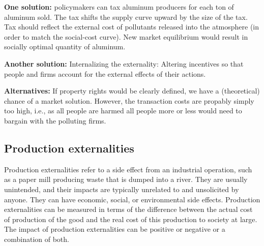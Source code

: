 \textbf{One solution:} policymakers can tax aluminum producers for each ton of aluminum sold.
The tax shifts the supply curve upward by the size of the tax.
Tax should reflect the external cost of pollutants released into the atmosphere (in order to match the social-cost curve).
New market equilibrium would result in socially optimal quantity of aluminum.

\textbf{Another solution:} Internalizing the externality: Altering incentives so that people and firms account for the external effects of their actions.

\textbf{Alternatives:} If property rights would be clearly defined, we have a (theoretical) chance of a market solution. However, the transaction costs are propably simply too high, i.e., as all people are harmed all people more or less would need to bargain with the polluting firms.





\pbn
\subsection{Production externalities}

Production externalities refer to a side effect from an industrial operation, such as a paper mill producing waste that is dumped into a river. They are usually unintended, and their impacts are typically unrelated to and unsolicited by anyone. They can have economic, social, or environmental side effects. 
Production externalities can be measured in terms of the difference between the actual cost of production of the good and the real cost of this production to society at large. The impact of production externalities can be positive or negative or a combination of both. 

